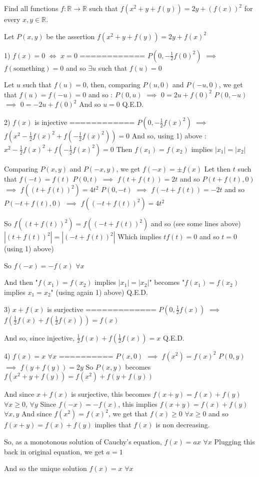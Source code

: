 \begin{solution}
	\begin{tcolorbox}Find all functions $f: \mathbb{R} \rightarrow \mathbb{R}$ such that $f(x^2 + y + f(y)) = 2y + (f(x))^2$ for every $x, y \in \mathbb{R}$.\end{tcolorbox}
Let $P(x,y)$ be the assertion $f(x^2+y+f(y))=2y+f(x)^2$

1) $f(x)=0$ $\iff$ $x=0$
============
$P(0,-\frac 12f(0)^2)$ $\implies$ $f(\text{something})=0$ and so $\exists u$ such that $f(u)=0$

Let $u$ such that $f(u)=0$, then, comparing $P(u,0)$ and $P(-u,0)$, we get that $f(u)=f(-u)=0$ and so :
$P(0,u)$ $\implies$ $0=2u+f(0)^2$
$P(0,-u)$ $\implies$ $0=-2u+f(0)^2$
And so $u=0$
Q.E.D.

2) $f(x)$ is injective
============
$P(0,-\frac 12f(x)^2)$ $\implies$ $f(x^2-\frac 12f(x)^2+f(-\frac 12f(x)^2))=0$
And  so, using 1) above : $x^2-\frac 12f(x)^2+f(-\frac 12f(x)^2)=0$
Then $f(x_1)=f(x_2)$ implies $|x_1|=|x_2|$

Comparing $P(x,y)$ and $P(-x,y)$, we get $f(-x)=\pm f(x)$
Let then $t$ such that $f(-t)=f(t)$
$P(0,t)$ $\implies$ $f(t+f(t))=2t$ and so $P(t+f(t),0)$ $\implies$ $f((t+f(t))^2)=4t^2$
$P(0,-t)$ $\implies$ $f(-t+f(t))=-2t$ and so $P(-t+f(t),0)$ $\implies$ $f((-t+f(t))^2)=4t^2$

So $f((t+f(t))^2)=f((-t+f(t))^2)$ and so (see some lines above) $|(t+f(t))^2|=|(-t+f(t))^2|$
Which implies $tf(t)=0$ and so $t=0$ (using 1) above)

So $f(-x)=-f(x)$ $\forall x$

And then "$f(x_1)=f(x_2)$ implies $|x_1|=|x_2|$" becomes "$f(x_1)=f(x_2)$  implies $x_1=x_2$" (using again 1) above)
Q.E.D.

3) $x+f(x)$ is surjective
=============
$P(0,\frac 12f(x))$ $\implies$ $f(\frac 12f(x)+f(\frac 12f(x)))=f(x)$

And so, since injective,  $\frac 12f(x)+f(\frac 12f(x))=x$
Q.E.D.

4) $f(x)=x$ $\forall x$
==========
$P(x,0)$ $\implies$ $f(x^2)=f(x)^2$
$P(0,y)$ $\implies$ $f(y+f(y))=2y$
So $P(x,y)$ becomes $f(x^2+y+f(y))=f(x^2)+f(y+f(y))$

And since $x+f(x)$ is surjective, this becomes $f(x+y)=f(x)+f(y)$ $\forall x\ge 0$, $\forall y$
Since $f(-x)=-f(x)$, this implies $f(x+y)=f(x)+f(y)$ $\forall x,y$
And since $f(x^2)=f(x)^2$, we get that $f(x)\ge 0$ $\forall x\ge 0$ and so $f(x+y)=f(x)+f(y)$ implies that $f(x)$ is non decreasing.

So, as a monotonous solution of Cauchy's equation, $f(x)=ax$ $\forall x$
Plugging this back in original equation, we get $a=1$

And so the unique solution $\boxed{f(x)=x}$ $\forall x$
\end{solution}



